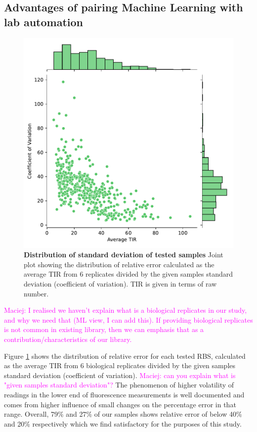 \documentclass{article}
\newcommand{\mengyan}[1]{\textcolor{magenta}{#1}}
\begin{document}
\subsection{Advantages of pairing Machine Learning with lab automation}

\begin{figure}[!ht]
    \centering
    \includegraphics[scale=0.75]{plots/Main_Paper/SD.pdf}
    \caption{\textbf{Distribution of standard deviation of tested samples} Joint plot showing the distribution of relative error calculated as the average TIR from 6 replicates divided by the given samples standard deviation (coefficient of variation). TIR is given in terms of raw number.}
    \label{fig: SD}
\end{figure}

\mengyan{Maciej: I realised we haven't explain what is a biological replicates in our study, and why we need that (ML view, I can add this). If providing biological replicates is not common in existing library, then we can emphasis that as a contribution/characteristics of our library.}

Figure \ref{fig: SD} shows the distribution of relative error for each tested RBS, calculated as the average TIR from 6 biological replicates divided by the given samples standard deviation (coefficient of variation).
\mengyan{Maciej: can you explain what is "given samples standard deviation"?}
The phenomenon of higher volatility of readings in the lower end of fluorescence measurements is well documented and comes from higher influence of small changes on the percentage error in that range.
Overall, 79\% and 27\% of our samples shows relative error of below 40\% and 20\% respectively which we find satisfactory for the purposes of this study.
\end{document}
